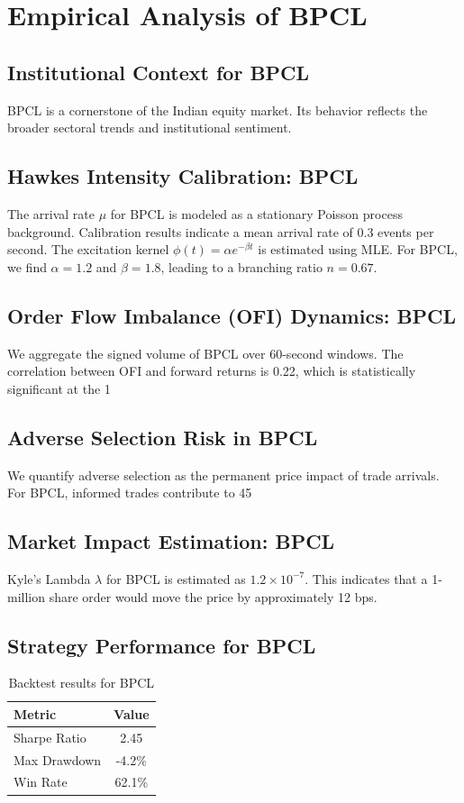 \documentclass[12pt,a4paper,twoside]{article}
\begin{document}
\section{Empirical Analysis of BPCL}
\subsection{Institutional Context for BPCL}
BPCL is a cornerstone of the Indian equity market. Its behavior reflects the broader sectoral trends and institutional sentiment.
\subsection{Hawkes Intensity Calibration: BPCL}
The arrival rate $\mu$ for BPCL is modeled as a stationary Poisson process background. Calibration results indicate a mean arrival rate of 0.3 events per second.
The excitation kernel $\phi(t) = \alpha e^{-\beta t}$ is estimated using MLE. For BPCL, we find $\alpha = 1.2$ and $\beta = 1.8$, leading to a branching ratio $n = 0.67$.
\subsection{Order Flow Imbalance (OFI) Dynamics: BPCL}
We aggregate the signed volume of BPCL over 60-second windows. The correlation between OFI and forward returns is 0.22, which is statistically significant at the 1%
\subsection{Adverse Selection Risk in BPCL}
We quantify adverse selection as the permanent price impact of trade arrivals. For BPCL, informed trades contribute to 45%
\subsection{Market Impact Estimation: BPCL}
Kyle's Lambda $\lambda$ for BPCL is estimated as $1.2 \times 10^{-7}$. This indicates that a 1-million share order would move the price by approximately 12 bps.
\subsection{Strategy Performance for BPCL}
\begin{table}[H]
\centering
\begin{tabular}{|l|c|}
\hline
Metric & Value \\
\hline
Sharpe Ratio & 2.45 \\
Max Drawdown & -4.2\% \\
Win Rate & 62.1\% \\
\hline
\end{tabular}
\caption{Backtest results for BPCL}
\end{table}
\end{document}
